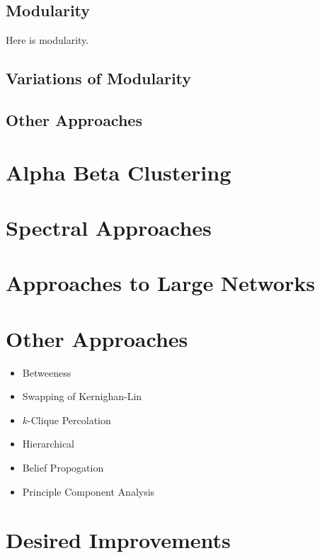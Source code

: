 \documentclass[phd,tocprelim]{cornell}
\begin{document}


\subsection{Modularity}

Here is modularity.

\subsection{Variations of Modularity}

\subsection{Other Approaches}



\section{Alpha Beta Clustering}



\section{Spectral Approaches}

\section{Approaches to Large Networks}



\section {Other Approaches}

\begin{itemize}
\item Betweeness
\item Swapping of Kernighan-Lin
\item $k$-Clique Percolation
\item Hierarchical
\item Belief Propogation
\item Principle Component Analysis
\end{itemize}


\section {Desired Improvements}
\end{document}
